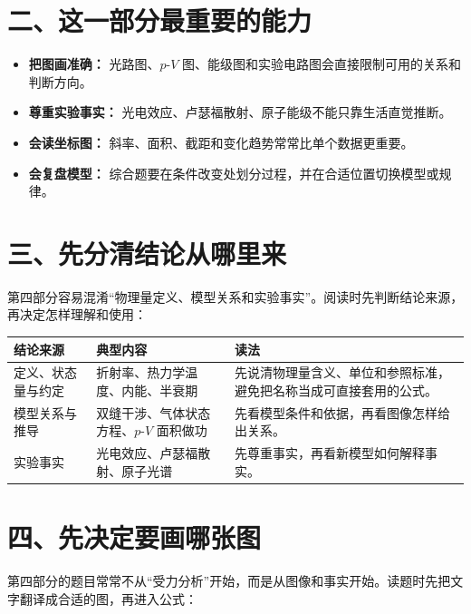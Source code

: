 \section*{二、这一部分最重要的能力}

\begin{itemize}[itemsep=0.2em]
  \item \textbf{把图画准确：} 光路图、$p$-$V$ 图、能级图和实验电路图会直接限制可用的关系和判断方向。
  \item \textbf{尊重实验事实：} 光电效应、卢瑟福散射、原子能级不能只靠生活直觉推断。
  \item \textbf{会读坐标图：} 斜率、面积、截距和变化趋势常常比单个数据更重要。
  \item \textbf{会复盘模型：} 综合题要在条件改变处划分过程，并在合适位置切换模型或规律。
\end{itemize}

\section*{三、先分清结论从哪里来}

第四部分容易混淆“物理量定义、模型关系和实验事实”。阅读时先判断结论来源，再决定怎样理解和使用：

\begin{center}
\begin{tabular}{p{}p{}p{}}
\toprule
\textbf{结论来源} & \textbf{典型内容} & \textbf{读法} \\
\midrule
定义、状态量与约定 & 折射率、热力学温度、内能、半衰期 & 先说清物理量含义、单位和参照标准，避免把名称当成可直接套用的公式。 \\
模型关系与推导 & 双缝干涉、气体状态方程、$p$-$V$ 面积做功 & 先看模型条件和依据，再看图像怎样给出关系。 \\
实验事实 & 光电效应、卢瑟福散射、原子光谱 & 先尊重事实，再看新模型如何解释事实。 \\
\bottomrule
\end{tabular}
\end{center}

\section*{四、先决定要画哪张图}

第四部分的题目常常不从“受力分析”开始，而是从图像和事实开始。读题时先把文字翻译成合适的图，再进入公式：

